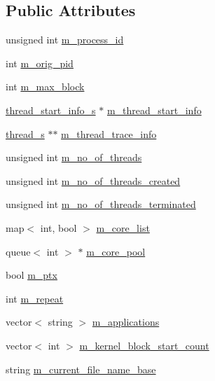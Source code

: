 \subsection*{Public Attributes}
\begin{DoxyCompactItemize}
\item 
unsigned int \hyperlink{structprocess__s_a177fa7999a4380f87de1d1020972d0d8}{m\_\-process\_\-id}
\item 
int \hyperlink{structprocess__s_af321df6fbc03573f3b665b27b857446e}{m\_\-orig\_\-pid}
\item 
int \hyperlink{structprocess__s_a57fa57ad2c2538de96d40d2908837331}{m\_\-max\_\-block}
\item 
\hyperlink{structthread__start__info__s}{thread\_\-start\_\-info\_\-s} $\ast$ \hyperlink{structprocess__s_a948322a5587615947b1080e04f2c76b8}{m\_\-thread\_\-start\_\-info}
\item 
\hyperlink{structthread__s}{thread\_\-s} $\ast$$\ast$ \hyperlink{structprocess__s_ad7a7f06130499ec66febeab3aa686d5b}{m\_\-thread\_\-trace\_\-info}
\item 
unsigned int \hyperlink{structprocess__s_a0da37eb04b86d5257061ad58c55df5fe}{m\_\-no\_\-of\_\-threads}
\item 
unsigned int \hyperlink{structprocess__s_a56d830c06a9f3a2b1569c9d1894ab6e2}{m\_\-no\_\-of\_\-threads\_\-created}
\item 
unsigned int \hyperlink{structprocess__s_a0debe2b803da90b86dcbd113fa79c5e4}{m\_\-no\_\-of\_\-threads\_\-terminated}
\item 
map$<$ int, bool $>$ \hyperlink{structprocess__s_a407d38bd942dd27e620147ac8af9a0a4}{m\_\-core\_\-list}
\item 
queue$<$ int $>$ $\ast$ \hyperlink{structprocess__s_a12b9ed9259a013ff8126089193c93dc2}{m\_\-core\_\-pool}
\item 
bool \hyperlink{structprocess__s_a4578e18b431979d88d1782a080c0b4ce}{m\_\-ptx}
\item 
int \hyperlink{structprocess__s_a7f5a5304526964f084a24b68b0132d7a}{m\_\-repeat}
\item 
vector$<$ string $>$ \hyperlink{structprocess__s_a3f8f9f073f0fc6dfe9c26078a125613c}{m\_\-applications}
\item 
vector$<$ int $>$ \hyperlink{structprocess__s_ae9086b0940b39f7769ee8c2e9b8dadf9}{m\_\-kernel\_\-block\_\-start\_\-count}
\item 
string \hyperlink{structprocess__s_a5bc754a24b94de3a4b1613290905d249}{m\_\-current\_\-file\_\-name\_\-base}
\item 
$$
\end{DoxyCompactItemize}
